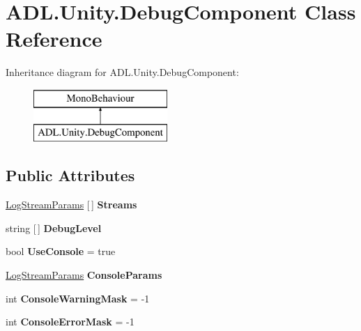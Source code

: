 \hypertarget{class_a_d_l_1_1_unity_1_1_debug_component}{}\section{A\+D\+L.\+Unity.\+Debug\+Component Class Reference}
\label{class_a_d_l_1_1_unity_1_1_debug_component}
Inheritance diagram for A\+D\+L.\+Unity.\+Debug\+Component\+:\begin{figure}[H]
\begin{center}
\leavevmode
\includegraphics[height=2.000000cm]{class_a_d_l_1_1_unity_1_1_debug_component}
\end{center}
\end{figure}
\subsection*{Public Attributes}
\begin{DoxyCompactItemize}
\item 
\mbox{\label{class_a_d_l_1_1_unity_1_1_debug_component_a2aa57f89e78ecf57df57b7a0819b8a03}} 
\mbox{\hyperlink{class_a_d_l_1_1_unity_1_1_log_stream_params}{Log\+Stream\+Params}} \mbox{[}$\,$\mbox{]} {\bfseries Streams}
\item 
\mbox{\label{class_a_d_l_1_1_unity_1_1_debug_component_a291ba4f39b3eeb64032fffaf0273bcd4}} 
string \mbox{[}$\,$\mbox{]} {\bfseries Debug\+Level}
\item 
\mbox{\label{class_a_d_l_1_1_unity_1_1_debug_component_a265f04906b1dea90b4fd596c54487cd6}} 
bool {\bfseries Use\+Console} = true
\item 
\mbox{\label{class_a_d_l_1_1_unity_1_1_debug_component_ab71e17ba3b7484cdff81a134138f6a3a}} 
\mbox{\hyperlink{class_a_d_l_1_1_unity_1_1_log_stream_params}{Log\+Stream\+Params}} {\bfseries Console\+Params}
\item 
\mbox{\label{class_a_d_l_1_1_unity_1_1_debug_component_a54d243584c6cf8386fcdd889087ffd84}} 
int {\bfseries Console\+Warning\+Mask} = -\/1
\item 
\mbox{\label{class_a_d_l_1_1_unity_1_1_debug_component_a32a3c2d7d092ce8fa1834a0f29efd2b5}} 
int {\bfseries Console\+Error\+Mask} = -\/1
\end{DoxyCompactItemize}
